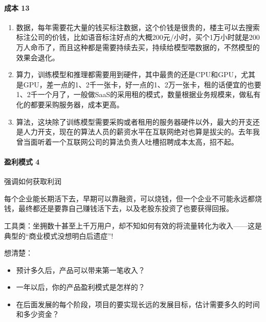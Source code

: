 \documentclass[letterpaper,10pt,english]{sphinxmanual}
\begin{document}
\paragraph{成本 13\sphinxfootnotemark[142]}
\label{\detokenize{chapter_introduction/money:id7}}%
\begin{footnotetext}[142]\sphinxAtStartFootnote
{}
%
\end{footnotetext}\ignorespaces \begin{enumerate}
%
\item {} 
数据，每年需要花大量的钱买标注数据，这个价钱是很贵的，楼主可以去搜索标注公司的价钱，比如语音标注好点的大概200元/小时，买个1万小时就是200万人命币了，而且这种都是需要持续去买，持续给模型喂数据的，不然模型的效果会退化。

\item {} 
算力，训练模型和推理都需要用到硬件，其中最贵的还是CPU和GPU，尤其是GPU，差一点的1、2千一张卡，好一点的1、2万一张卡，租的话便宜的也要1、2千一个月了，一般做SaaS的采用租的模式，数量根据业务规模来，做私有化的都要采购服务器，成本更高。

\item {} 
算法，这块除了训练模型需要采购或者租用的服务器硬件以外，最大的开支还是人力开支，现在的算法人员的薪资水平在互联网绝对也算是拔尖的。去年我曾当面听着一个互联网公司的算法负责人吐槽招聘成本太高，招不起。

\end{enumerate}


\paragraph{盈利模式 4\sphinxfootnotemark[143]}
\label{\detokenize{chapter_introduction/money:id8}}%
\begin{footnotetext}[143]\sphinxAtStartFootnote
{}
%
\end{footnotetext}\ignorespaces 
强调如何获取利润

每个企业能长期活下去，早期可以靠融资，可以烧钱，但一个企业不可能永远都烧钱，最终都还是要靠自己赚钱活下去，以及老股东投资了也要获得回报。

工具类：坐拥数十甚至上千万用户，却不知如何有效的将流量转化为收入——这是典型的“商业模式没想明白后遗症”!

想清楚：
\begin{itemize}
\item {} 
预计多久后，产品可以带来第一笔收入？

\item {} 
一年以后，你的产品盈利模式是怎样的？

\item {} 
在后面发展的每个阶段，项目的要实现长远的发展目标，估计需要多久的时间和多少资金？

\end{itemize}
\end{document}
